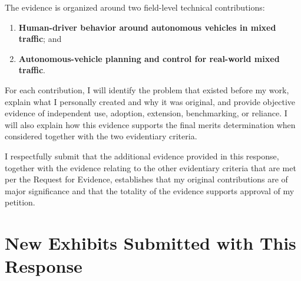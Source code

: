 \documentclass[11pt,letterpaper]{article}
\begin{document}
The evidence is organized around two field-level technical contributions:

\begin{enumerate}
\item \textbf{Human-driver behavior around autonomous vehicles in mixed traffic}; and
\item \textbf{Autonomous-vehicle planning and control for real-world mixed traffic}.
\end{enumerate}

For each contribution, I will identify the problem that existed before my work, explain what I personally created and why it was original, and provide objective evidence of independent use, adoption, extension, benchmarking, or reliance. I will also explain how this evidence supports the final merits determination when considered together with the two evidentiary criteria.

I respectfully submit that the additional evidence provided in this response, together with the evidence relating to the other evidentiary criteria that are met per the Request for Evidence, establishes that my original contributions are of major significance and that the totality of the evidence supports approval of my petition.

\newpage
\section*{New Exhibits Submitted with This Response}
\end{document}
